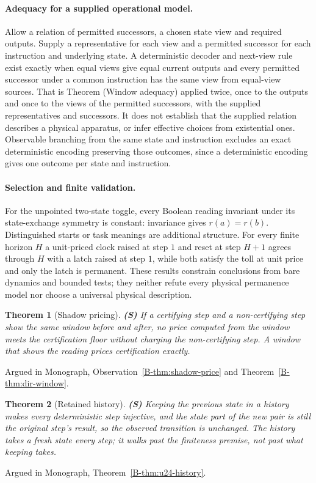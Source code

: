 \documentclass[11pt, a4paper]{report}
\theoremstyle{definition}
\theoremstyle{plain}
\newtheorem{theorem}{Theorem}[chapter]
\begin{document}
\paragraph{Adequacy for a supplied operational model.}
Allow a relation of permitted successors, a chosen state view and required
outputs. Supply a representative for each view and a permitted successor
for each instruction and underlying state. A deterministic decoder and
next-view rule exist exactly when equal views give equal current outputs
and every permitted successor under a common instruction has the same view
from equal-view sources. That is Theorem (Window adequacy) applied twice, once
to the outputs and once to the views of the permitted successors, with the
supplied representatives and successors. It does not establish that the
supplied relation describes a physical apparatus, or infer effective choices
from existential ones. Observable branching from the same state and
instruction excludes an exact deterministic encoding preserving those
outcomes, since a deterministic encoding gives one outcome per state and
instruction.

\paragraph{Selection and finite validation.}
For the unpointed two-state toggle, every Boolean reading invariant under
its state-exchange symmetry is constant: invariance gives $r(a) = r(b)$.
Distinguished starts or task meanings are additional structure. For every
finite horizon $H$ a unit-priced clock raised at step $1$ and reset at step
$H + 1$ agrees through $H$ with a latch raised at step $1$, while both satisfy
the toll at unit price and only the latch is permanent.
These results constrain conclusions from bare dynamics and bounded tests;
they neither refute every physical permanence model nor choose a universal
physical description.

\begin{theorem}[Shadow pricing] \textbf{(S)}
If a certifying step and a non-certifying step show the same window before and after, no price computed from the window meets the certification floor without charging the non-certifying step.
A window that shows the reading prices certification exactly.
\end{theorem}
\noindent Argued in Monograph, Observation~\ref{B-thm:shadow-price} and Theorem~\ref{B-thm:dir-window}.

\begin{theorem}[Retained history] \textbf{(S)}
Keeping the previous state in a history makes every deterministic step injective, and the state part of the new pair is still the original step's result, so the observed transition is unchanged. The history takes a fresh state every step; it walks past the finiteness premise, not past what keeping takes.
\end{theorem}
\noindent Argued in Monograph, Theorem~\ref{B-thm:u24-history}.
\end{document}
